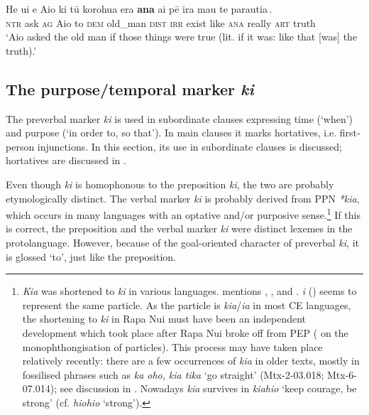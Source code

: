 \ea\label{ex:11.185}
\gll He {\ꞌ}ui e Aio ki tū korohu{\ꞌ}a era \textbf{ana} ai {\ob}pē ira mau te parauti{\ꞌ}a\,{\cb}. \\
\textsc{ntr} ask \textsc{ag} Aio to \textsc{dem} old\_man \textsc{dist} \textsc{irr} exist {\db}like \textsc{ana} really \textsc{art} truth \\

\glt 
‘Aio asked the old man if those things were true (lit. if it was: like that [was] the truth).’ \textstyleExampleref{[R532-14.016]}
\z
{}
\subsection{The purpose/temporal marker \textit{ki}}\label{sec:11.5.3}
The preverbal marker \textit{ki} is used in subordinate clauses expressing time (‘when’) and purpose (‘in order to, so that’). In main clauses it marks hortatives, i.e. first-person injunctions. In this section, its use in subordinate clauses is discussed; hortatives are discussed in . 

Even though \textit{ki} is homophonous to the preposition \textit{ki}, the two are probably etymologically distinct. The verbal marker \textit{ki} is probably derived from PPN \textit{*kia}, which occurs in many languages with an optative and/or purposive sense.\footnote{\label{fn:524}\textit{Kia} was shortened to \textit{ki} in various languages. \citet[30]{Clark1976} mentions , ,  and .  \textit{i} (\citealt[61]{ElbertPukui1979}) seems to represent the same particle. As the particle is \textit{kia}/\textit{{\ꞌ}ia} in most CE languages, the shortening to \textit{ki} in Rapa Nui must have been an independent development which took place after Rapa Nui broke off from PEP ( on the monophthongisation of particles). This process may have taken place relatively recently: there are a few occurrences of \textit{kia} in older texts, mostly in fossilised phrases such as \textit{ka oho,} \textit{kia tika} ‘go straight’ (Mtx-2-03.018; Mtx-6-07.014); see discussion in \citet[429]{Fischer1994}. Nowadays \textit{kia} survives in \textit{kiahio} ‘keep courage, be strong’ (cf. \textit{hiohio} ‘strong’).}  If this is correct, the preposition and the verbal marker \textit{ki} were distinct lexemes in the protolanguage. However, because of the goal-oriented character of preverbal \textit{ki}, it is glossed ‘to’, just like the preposition.

